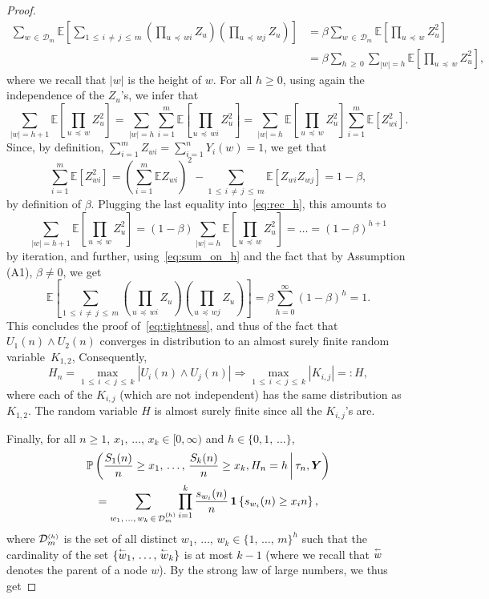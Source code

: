 \documentclass[AHL,Unicode,longabstracts,published]{cedram}
\newcommand{\bs}{\ensuremath{\boldsymbol}}
\newcommand{\sss}{\ensuremath{\scriptscriptstyle}}
\newcommand{\parent}{\overset{\sss\leftarrow}}
\newcommand{\bbP}{\mathbb{P}}
\newcommand{\bbE}{\mathbb{E}}
\newcommand{\clD}{\mathcal{D}}
\begin{document}
\begin{proof}
\begin{equation}\label{eq:sum_on_h}
\begin{split}
\sum_{w\,\in\,\clD_m}
\bbE\left[\sum_{1\,\leq\,i\,\neq\,j\,\leq\,m} \left(\prod_{u\,\preccurlyeq\,wi}Z_u\right) \left(\prod_{u\,\preccurlyeq\,wj}Z_u\right)\right] &= \beta \sum_{w\,\in\,\clD_m} \bbE\left[\prod_{u\,\preccurlyeq\, w}Z^2_u\right]\\
&= \beta \sum_{h\,\geq\,0} \sum_{|w|=h} \bbE\left[\prod_{u\,\preccurlyeq\,w}Z^2_u\right],
\end{split}
\end{equation}
where we recall that $|w|$ is the height of $w$. For all $h\geq 0$, using again the independence of the $Z_u$'s, we infer that
\begin{equation}\label{eq:rec_h}
\sum_{|w|=h+1} \bbE\left[\prod_{u\,\preccurlyeq\,w}Z^2_u\right] = \sum_{|w|=h} \sum_{i=1}^m \bbE\left[\prod_{u\,\preccurlyeq\,wi} Z^2_u\right] = \sum_{|w|=h}\bbE\left[\prod_{u\,\preccurlyeq\,w}Z^2_u\right] \sum_{i=1}^m \bbE\left[Z^2_{wi}\right].
\end{equation}
Since, by definition, $\sum_{i=1}^m Z_{wi} = \sum_{i=1}^n Y_i(w) = 1$, we get that
\[
\sum_{i=1}^m \bbE \left[Z^2_{wi}\right] = \left(\sum_{i=1}^m \bbE Z_{wi}\right)^2 - \sum_{1\,\leq\,i\,\neq\,j\,\leq\,m} \bbE \left[Z_{wi}Z_{wj}\right] = 1-\beta,
\]
by definition of $\beta$. Plugging the last equality into~\eqref{eq:rec_h}, this amounts to
\[
\sum_{|w|=h+1} \bbE\left[\prod_{u\,\preccurlyeq\,w}Z^2_u\right] = (1-\beta) \sum_{|w|=h}\bbE\left[\prod_{u\,\preccurlyeq\,w}Z^2_u\right] = \dots = (1-\beta)^{h+1}
\]
by iteration, and further, using~\eqref{eq:sum_on_h} and the fact that by Assumption (A1), $\beta\neq 0$, we get
\[
\bbE\left[\sum_{1\,\leq\,i\,\neq\,j\,\leq\,m} \left(\prod_{u\,\preccurlyeq\,wi}Z_u\right) \left(\prod_{u\,\preccurlyeq\,wj}Z_u\right)\right] = \beta \sum_{h=0}^{\infty} (1-\beta)^h = 1.
\]
This concludes the proof of~\eqref{eq:tightness}, and thus of the fact that $U_1(n)\wedge U_2(n)$ converges in distribution to an almost surely finite random variable~$K_{1,2}$, Consequently,
\[
H_n=\max_{1\,\le\,i\,<\,j\,\le\,k} \left|U_i(n)\wedge U_j(n)\right| \Rightarrow \max_{1\,\le\,i\,<\,j\,\le\,k} \left|K_{i,j}\right|=:H,
\]
where each of the $K_{i,j}$ (which are not independent) has the same distribution as $K_{1,2}.$ The random variable $H$ is almost surely finite since all the $K_{i,j}$'s are.

Finally, for all $n\geq 1$, $x_1, \,\ldots,\, x_k\in [0,\infty)$ and $h\in\{0, 1, \,\ldots\}$,
\begin{multline*}
\bbP\left(\frac{S_1(n)}n\geq x_1, \,\ldots,\, \frac{S_k(n)}n\geq x_k, H_n = h \,\middle|\,\tau_n, \bs Y\right)\\
=\sum_{w_1, \,\ldots,\, w_k\,\in\,\clD_m^{\sss (h)}}
\prod_{i=1}^k \frac{s_{w_i}(n)}n\,\bs 1\left\{s_{w_i}(n)\geq x_i n\right\},
\end{multline*}
where $\clD_m^{\sss (h)}$ is the set of all distinct $w_1,\,\ldots,\, w_k\in\{1, \,\ldots,\, m\}^h$ such that the cardinality of the set $\{\parent w_1, \,\ldots,\, \parent w_k\}$ is at most $k-1$ (where we recall that $\parent w$ denotes the parent of a node $w$). By the strong law of large numbers, we thus get


\end{proof}
\end{document}
